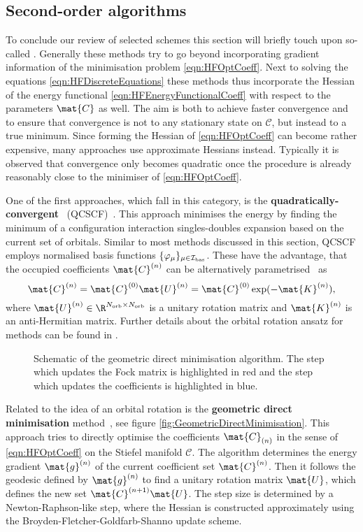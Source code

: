 \subsection{Second-order \SCF algorithms}
\label{sec:SOSCF}

To conclude our review of selected \SCF schemes
this section will briefly touch upon so-called .
Generally these methods try to go beyond incorporating
gradient information of the \HF minimisation problem \eqref{eqn:HFOptCoeff}.
Next to solving the \HF equations \eqref{eqn:HFDiscreteEquations}
these methods thus incorporate the  Hessian
of the energy functional \eqref{eqn:HFEnergyFunctionalCoeff}
with respect to the parameters $\mat{C}$ as well.
The aim is both to achieve faster convergence
and to ensure that convergence is not to any stationary state on $\mathcal{C}$,
but instead to a true \SCF minimum.
Since forming the Hessian of \eqref{eqn:HFOptCoeff} can become rather expensive,
many approaches use approximate Hessians instead.
Typically it is observed
that convergence only becomes quadratic
once the \SCF procedure is already reasonably
close to the minimiser of \eqref{eqn:HFOptCoeff}.

One of the first approaches, which fall in this category,
is the \textbf{quadratically-convergent \SCF}~(QCSCF)~\cite{Bacskay1981}.
This approach minimises the \SCF energy by finding the minimum of a
configuration interaction singles-doubles expansion
based on the current set of \SCF orbitals.
Similar to most methods discussed in this section,
QCSCF employs normalised basis functions $\{\varphi_\mu\}_{\mu\in\mathcal{I}_\text{bas}}$.
These have the advantage, that the occupied \SCF coefficients $\mat{C}^{(n)}$
can be alternatively parametrised~\cite{Helgaker2013} as
\[ \mat{C}^{(n)} = \mat{C}^{(0)} \mat{U}^{(n)} = \mat{C}^{(0)} \exp(-\mat{K}^{(n)}), \]
where $\mat{U}^{(n)} \in \R^{\Norb \times \Norb}$ is a unitary rotation matrix
and $\mat{K}^{(n)}$ is an anti-Hermitian matrix.
Further details about the orbital rotation ansatz for \SCF methods
can be found in \cite{Helgaker2013}.

\begin{figure}
	\centering
	\caption[Geometric direct minimisation algorithm]%
	{Schematic of the geometric direct minimisation algorithm.
	The step which updates the Fock matrix is highlighted in red
	and the step which updates the coefficients is highlighted in blue.
	}
	\label{fig:GeometricDirectMinimisation}
\end{figure}
Related to the idea of an orbital rotation \SCF
is the \textbf{geometric direct minimisation} method~\cite{Voorhis2002},
see figure \vref{fig:GeometricDirectMinimisation}.
This approach tries to directly
optimise the coefficients $\mat{C}_{(n)}$ in the sense of \eqref{eqn:HFOptCoeff}
on the Stiefel manifold $\mathcal{C}$.
The algorithm determines the energy gradient $\mat{g}^{(n)}$
of the current coefficient set $\mat{C}^{(n)}$.
Then it follows the geodesic defined by $\mat{g}^{(n)}$
to find a unitary rotation matrix $\mat{U}$,
which defines the new set $\mat{C}^{(n+1)} \mat{U}$.
The step size is determined by a Newton-Raphson-like step,
where the Hessian is constructed
approximately using the Broyden-Fletcher-Goldfarb-Shanno update scheme.

